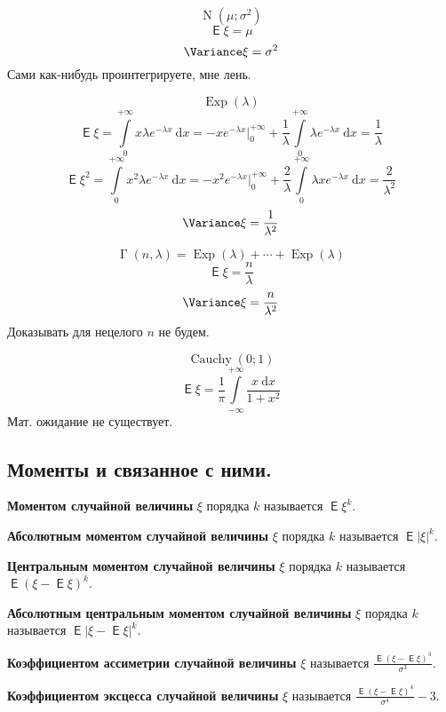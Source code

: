 \documentclass{article}
\DeclareMathOperator{\Expected}{\mathsf{E}}
\begin{document}
    \begin{example}
       $$\hyperref[N]{\operatorname{N}}(\mu;\sigma^2)$$
       $$\Expected\xi=\mu$$
       $$\Variance\xi=\sigma^2$$
       Сами как-нибудь проинтегрируете, мне лень.
    \end{example}
    \begin{example}
        $$\hyperref[Exp]{\operatorname{Exp}}(\lambda)$$
        $$\Expected\xi=\int\limits_0^{+\infty}x\lambda e^{-\lambda x}~\mathrm dx=-xe^{-\lambda x}\Big|_0^{+\infty}+\frac1\lambda\int\limits_0^{+\infty}\lambda e^{-\lambda x}~\mathrm dx=\frac1\lambda$$
        $$\Expected\xi^2=\int\limits_0^{+\infty}x^2\lambda e^{-\lambda x}~\mathrm dx=-x^2e^{-\lambda x}\Big|_0^{+\infty}+\frac2\lambda\int\limits_0^{+\infty}\lambda xe^{-\lambda x}~\mathrm dx=\frac2{\lambda^2}$$
        $$\Variance\xi=\frac1{\lambda^2}$$
    \end{example}
    \begin{example}
        $$\hyperref[Gamma-распределение]{\operatorname{\Gamma}}(n,\lambda)=\operatorname{Exp}(\lambda)+\cdots+\operatorname{Exp}(\lambda)$$
        $$\Expected\xi=\frac n\lambda$$
        $$\Variance\xi=\frac n{\lambda^2}$$
        Доказывать для нецелого $n$ не будем.
    \end{example}
    \begin{example}
        $$\hyperref[Cauchy]{\operatorname{Cauchy}}(0;1)$$
        $$\Expected\xi=\frac1\pi\int\limits_{-\infty}^{+\infty}\frac{x~\mathrm dx}{1+x^2}$$
        Мат. ожидание не существует.
    \end{example}
    \subsection{Моменты и связанное с ними.}
    \begin{definition}
        \textbf{Моментом случайной величины} $\xi$ порядка $k$ называется $\Expected \xi^k$.
    \end{definition}
    \begin{definition}
        \textbf{Абсолютным моментом случайной величины} $\xi$ порядка $k$ называется $\Expected |\xi|^k$.
    \end{definition}
    \begin{definition}
        \textbf{Центральным моментом случайной величины} $\xi$ порядка $k$ называется $\Expected (\xi-\Expected\xi)^k$.
    \end{definition}
    \begin{definition}
        \textbf{Абсолютным центральным моментом случайной величины} $\xi$ порядка $k$ называется $\Expected|\xi-\Expected\xi|^k$.
    \end{definition}
    \begin{definition}
        \textbf{Коэффициентом ассиметрии случайной величины} $\xi$ называется $\frac{\Expected (\xi-\Expected\xi)^3}{\sigma^3}$.
    \end{definition}
    \begin{definition}
        \textbf{Коэффициентом эксцесса случайной величины} $\xi$ называется $\frac{\Expected (\xi-\Expected\xi)^4}{\sigma^4}-3$.
    \end{definition}
\end{document}
